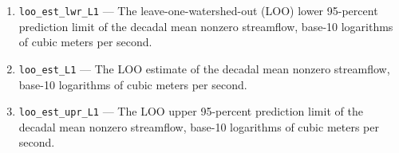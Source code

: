 \documentclass[1p, authoryear, 11pt, times, preprint]{elsarticle}
\newcommand{\code}[1]{{\color{black}%
                       \mbox{\lstinline[basicstyle={\small\ttfamily},
                                        keywordstyle=\scriptsize\ttfamily]|#1|}}}
\begin{document}
\begin{enumerate}
\item \code{loo_est_lwr_L1} --- The leave-one-watershed-out (LOO) lower 95-percent prediction limit of the decadal mean nonzero streamflow, base-10 logarithms of cubic meters per second.
\item \code{loo_est_L1} --- The LOO estimate of the decadal mean nonzero streamflow, base-10 logarithms of cubic meters per second.
\item \code{loo_est_upr_L1} --- The LOO upper 95-percent prediction limit of the decadal  mean nonzero streamflow, base-10 logarithms of cubic meters per second.
\end{enumerate}


\end{document}
